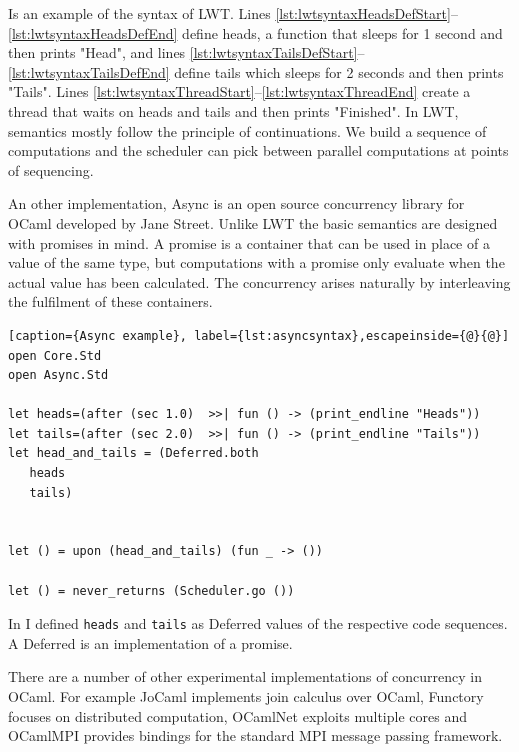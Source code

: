 \documentclass[12pt,twoside,notitlepage]{report}
\theoremstyle{plain}%
\theoremstyle{definition}
\theoremstyle{remark}
\begin{document}
Is  an example of the syntax of LWT. Lines \ref{lst:lwtsyntaxHeadsDefStart}--\ref{lst:lwtsyntaxHeadsDefEnd} define heads, a function that sleeps for 1 second and then prints "Head", and lines \ref{lst:lwtsyntaxTailsDefStart}--\ref{lst:lwtsyntaxTailsDefEnd} define tails which sleeps for 2 seconds and then prints "Tails".  Lines \ref{lst:lwtsyntaxThreadStart}--\ref{lst:lwtsyntaxThreadEnd} create a thread that waits on heads and tails and then prints "Finished".  In LWT, semantics mostly follow the principle of continuations. We build a sequence of computations and the scheduler can pick between parallel computations at points of sequencing.

An other implementation, Async is an open source concurrency library for OCaml developed by Jane Street. Unlike LWT the basic semantics are designed with promises in mind. A promise is a container that can be used in place of a value of the same type, but computations with a promise only evaluate when the actual value has been calculated. The concurrency arises naturally by interleaving the fulfilment of these containers. 


\begin{minipage}{\linewidth}

\begin{lstlisting}[caption={Async example}, label={lst:asyncsyntax},escapeinside={@}{@}]
open Core.Std
open Async.Std

let heads=(after (sec 1.0)  >>| fun () -> (print_endline "Heads"))
let tails=(after (sec 2.0)  >>| fun () -> (print_endline "Tails"))
let head_and_tails = (Deferred.both
   heads
   tails)


let () = upon (head_and_tails) (fun _ -> ())
  
let () = never_returns (Scheduler.go ())
\end{lstlisting}

\end{minipage}



In  I defined \verb|heads| and \verb|tails| as Deferred values of the respective code sequences. A Deferred is an implementation of a promise.


There are a number of other experimental implementations of concurrency in OCaml. For example JoCaml\cite{jocaml} implements join calculus over OCaml, Functory\cite{functory} focuses on distributed computation, OCamlNet exploits multiple cores and OCamlMPI\cite{ocamlmpi} provides bindings for the standard MPI message passing framework.
\end{document}

